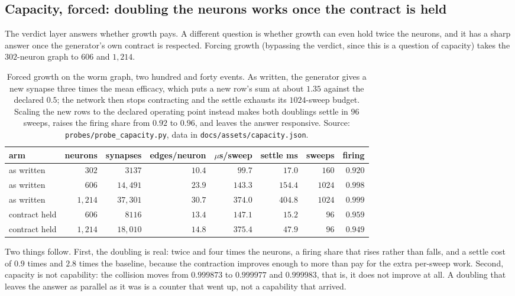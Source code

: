 \documentclass[11pt]{article}
\theoremstyle{remark}
\begin{document}
\subsection{Capacity, forced: doubling the neurons works once the contract is held}
\label{sec:capacity}

The verdict layer answers whether growth pays. A different question is whether growth can even hold
twice the neurons, and it has a sharp answer once the generator's own contract is respected. Forcing
growth (bypassing the verdict, since this is a question of capacity) takes the $302$-neuron graph to
$606$ and $1{,}214$.

\begin{table}[t]
\centering
\small
\caption{Forced growth on the worm graph, two hundred and forty events. As written, the generator
gives a new synapse three times the mean efficacy, which puts a new row's sum at about $1.35$ against
the declared $0.5$; the network then stops contracting and the settle exhausts its $1024$-sweep budget.
Scaling the new rows to the declared operating point instead makes both doublings settle in $96$
sweeps, raises the firing share from $0.92$ to $0.96$, and leaves the answer responsive. Source:
\texttt{probes/probe\_capacity.py}, data in \texttt{docs/assets/capacity.json}.}
\label{tab:capacity}
\begin{tabular}{@{}lrrrrrrr@{}}
\toprule
arm & neurons & synapses & edges/neuron & $\mu$s/sweep & settle ms & sweeps & firing \\
\midrule
as written & $302$ & $3137$ & $10.4$ & $99.7$ & $17.0$ & $160$ & $0.920$ \\
as written & $606$ & $14{,}491$ & $23.9$ & $143.3$ & $154.4$ & $1024$ & $0.998$ \\
as written & $1{,}214$ & $37{,}301$ & $30.7$ & $374.0$ & $404.8$ & $1024$ & $0.999$ \\
\midrule
contract held & $606$ & $8116$ & $13.4$ & $147.1$ & $15.2$ & $96$ & $0.959$ \\
contract held & $1{,}214$ & $18{,}010$ & $14.8$ & $375.4$ & $47.9$ & $96$ & $0.949$ \\
\bottomrule
\end{tabular}
\end{table}

Two things follow. First, the doubling is real: twice and four times the neurons, a firing share that
rises rather than falls, and a settle cost of $0.9$ times and $2.8$ times the baseline, because the
contraction improves enough to more than pay for the extra per-sweep work. Second, capacity is not
capability: the collision moves from $0.999873$ to $0.999977$ and $0.999983$, that is, it does not
improve at all. A doubling that leaves the answer as parallel as it was is a counter that went up,
not a capability that arrived.
\end{document}
